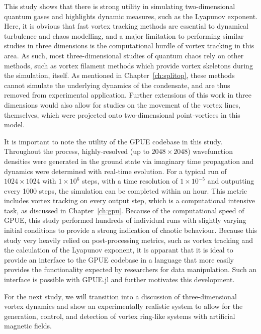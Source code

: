 This study shows that there is strong utility in simulating two-dimensional quantum gases and highlights dynamic measures, such as the Lyapunov exponent.
Here, it is obvious that fast vortex tracking methods are essential to dynamical turbulence and chaos modelling, and a major limitation to performing similar studies in three dimensions is the computational hurdle of vortex tracking in this area.
As such, most three-dimensional studies of quantum chaos rely on other methods, such as vortex filament methods which provide vortex skeletons during the simulation, itself.
As mentioned in Chapter~\ref{ch:splitop}, these methods cannot simulate the underlying dynamics of the condensate, and are thus removed from experimental application.
Further extensions of this work in three dimensions would also allow for studies on the movement of the vortex lines, themselves, which were projected onto two-dimensional point-vortices in this model.

It is important to note the utility of the GPUE codebase in this study.
Throughout the process, highly-resolved (up to $2048 \times 2048$) wavefunction densities were generated in the ground state via imaginary time propagation and dynamics were determined with real-time evolution.
For a typical run of $1024 \times 1024$ with $1\times 10^6$ steps, with a time resolution of $1\times 10^{-5}$ and outputting every 1000 steps, the simulation can be completed within an hour.
This metric includes vortex tracking on every output step, which is a computational intensive task, as discussed in Chapter~\ref{ch:gpu}.
Because of the computational speed of GPUE, this study performed hundreds of individual runs with slightly varying initial conditions to provide a strong indication of chaotic behaviour.
Because this study very heavily relied on post-processing metrics, such as vortex tracking and the calculation of the Lyapunov exponent, it is apparant that it is ideal to provide an interface to the GPUE codebase in a language that more easily provides the functionality expected by researchers for data manipulation.
Such an interface is possible with GPUE.jl and further motivates this development.

For the next study, we will transition into a discussion of three-dimensional vortex dynamics and show an experimentally realistic system to allow for the generation, control, and detection of vortex ring-like systems with artificial magnetic fields.


